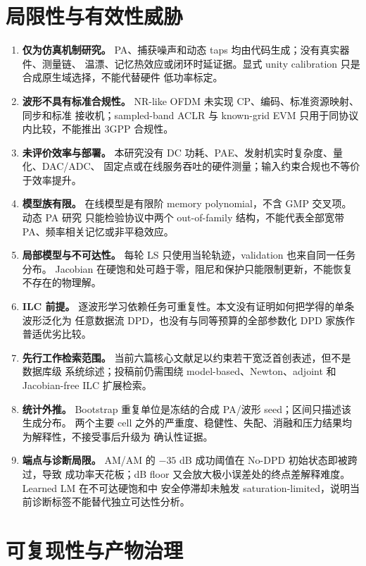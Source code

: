 \documentclass[UTF8,zihao=-4,a4paper]{ctexart}
\begin{document}
\section{局限性与有效性威胁}

\begin{enumerate}
  \item \textbf{仅为仿真机制研究。} PA、捕获噪声和动态 taps 均由代码生成；没有真实器件、测量链、
        温漂、记忆热效应或闭环时延证据。显式 unity calibration 只是合成原生域选择，不能代替硬件
        低功率标定。
  \item \textbf{波形不具有标准合规性。} NR-like OFDM 未实现 CP、编码、标准资源映射、同步和标准
        接收机；sampled-band ACLR 与 known-grid EVM 只用于同协议内比较，不能推出 3GPP 合规性。
  \item \textbf{未评价效率与部署。} 本研究没有 DC 功耗、PAE、发射机实时复杂度、量化、DAC/ADC、
        固定点或在线服务吞吐的硬件测量；输入约束合规也不等价于效率提升。
  \item \textbf{模型族有限。} 在线模型是有限阶 memory polynomial，不含 GMP 交叉项。动态 PA 研究
        只能检验协议中两个 out-of-family 结构，不能代表全部宽带 PA、频率相关记忆或非平稳效应。
  \item \textbf{局部模型与不可达性。} 每轮 LS 只使用当轮轨迹，validation 也来自同一任务分布。
        Jacobian 在硬饱和处可趋于零，阻尼和保护只能限制更新，不能恢复不存在的物理解。
  \item \textbf{ILC 前提。} 逐波形学习依赖任务可重复性。本文没有证明如何把学得的单条波形泛化为
        任意数据流 DPD，也没有与同等预算的全部参数化 DPD 家族作普适优劣比较。
  \item \textbf{先行工作检索范围。} 当前六篇核心文献足以约束若干宽泛首创表述，但不是数据库级
        系统综述；投稿前仍需围绕 model-based、Newton、adjoint 和 Jacobian-free ILC 扩展检索。
  \item \textbf{统计外推。} Bootstrap 重复单位是冻结的合成 PA/波形 seed；区间只描述该生成分布。
        两个主要 cell 之外的严重度、稳健性、失配、消融和压力结果均为解释性，不接受事后升级为
        确认性证据。
  \item \textbf{端点与诊断局限。} AM/AM 的 $-35$ dB 成功阈值在 No-DPD 初始状态即被跨过，导致
        成功率天花板；dB floor 又会放大极小误差处的终点差解释难度。Learned LM 在不可达硬饱和中
        安全停滞却未触发 saturation-limited，说明当前诊断标签不能替代独立可达性分析。
\end{enumerate}

\section{可复现性与产物治理}
\end{document}
